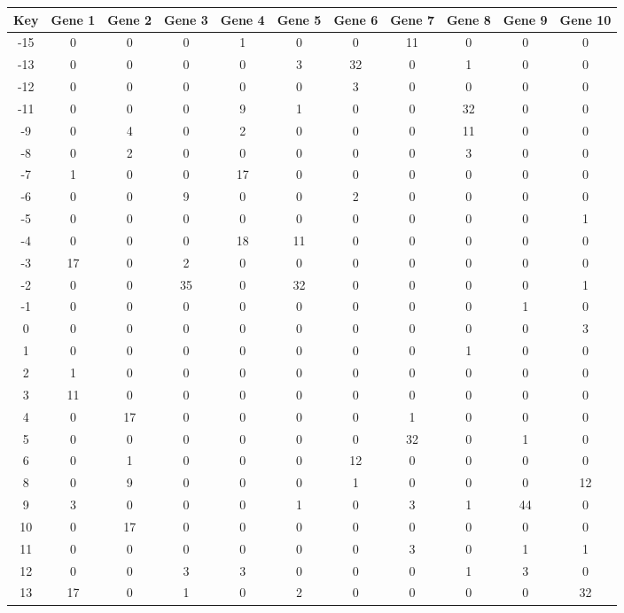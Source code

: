 \begin{tabular}{|c|c|c|c|c|c|c|c|c|c|c|}
\hline
Key & Gene 1 & Gene 2 & Gene 3 & Gene 4 & Gene 5 & Gene 6 & Gene 7 & Gene 8 & Gene 9 & Gene 10 \\
\hline
-15 & 0 & 0 & 0 & 1 & 0 & 0 & 11 & 0 & 0 & 0 \\
-13 & 0 & 0 & 0 & 0 & 3 & 32 & 0 & 1 & 0 & 0 \\
-12 & 0 & 0 & 0 & 0 & 0 & 3 & 0 & 0 & 0 & 0 \\
-11 & 0 & 0 & 0 & 9 & 1 & 0 & 0 & 32 & 0 & 0 \\
-9 & 0 & 4 & 0 & 2 & 0 & 0 & 0 & 11 & 0 & 0 \\
-8 & 0 & 2 & 0 & 0 & 0 & 0 & 0 & 3 & 0 & 0 \\
-7 & 1 & 0 & 0 & 17 & 0 & 0 & 0 & 0 & 0 & 0 \\
-6 & 0 & 0 & 9 & 0 & 0 & 2 & 0 & 0 & 0 & 0 \\
-5 & 0 & 0 & 0 & 0 & 0 & 0 & 0 & 0 & 0 & 1 \\
-4 & 0 & 0 & 0 & 18 & 11 & 0 & 0 & 0 & 0 & 0 \\
-3 & 17 & 0 & 2 & 0 & 0 & 0 & 0 & 0 & 0 & 0 \\
-2 & 0 & 0 & 35 & 0 & 32 & 0 & 0 & 0 & 0 & 1 \\
-1 & 0 & 0 & 0 & 0 & 0 & 0 & 0 & 0 & 1 & 0 \\
0 & 0 & 0 & 0 & 0 & 0 & 0 & 0 & 0 & 0 & 3 \\
1 & 0 & 0 & 0 & 0 & 0 & 0 & 0 & 1 & 0 & 0 \\
2 & 1 & 0 & 0 & 0 & 0 & 0 & 0 & 0 & 0 & 0 \\
3 & 11 & 0 & 0 & 0 & 0 & 0 & 0 & 0 & 0 & 0 \\
4 & 0 & 17 & 0 & 0 & 0 & 0 & 1 & 0 & 0 & 0 \\
5 & 0 & 0 & 0 & 0 & 0 & 0 & 32 & 0 & 1 & 0 \\
6 & 0 & 1 & 0 & 0 & 0 & 12 & 0 & 0 & 0 & 0 \\
8 & 0 & 9 & 0 & 0 & 0 & 1 & 0 & 0 & 0 & 12 \\
9 & 3 & 0 & 0 & 0 & 1 & 0 & 3 & 1 & 44 & 0 \\
10 & 0 & 17 & 0 & 0 & 0 & 0 & 0 & 0 & 0 & 0 \\
11 & 0 & 0 & 0 & 0 & 0 & 0 & 3 & 0 & 1 & 1 \\
12 & 0 & 0 & 3 & 3 & 0 & 0 & 0 & 1 & 3 & 0 \\
13 & 17 & 0 & 1 & 0 & 2 & 0 & 0 & 0 & 0 & 32 \\
\hline
\end{tabular}